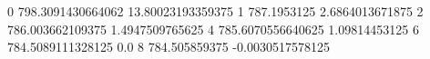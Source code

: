 0 798.3091430664062 13.80023193359375
1 787.1953125 2.6864013671875
2 786.003662109375 1.4947509765625
4 785.6070556640625 1.09814453125
6 784.5089111328125 0.0
8 784.505859375 -0.0030517578125
